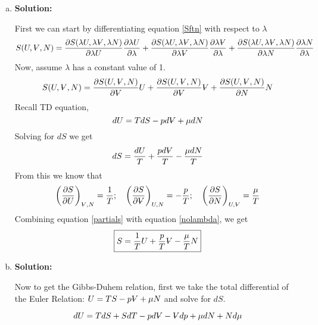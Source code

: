 \documentclass[10pt]{article}
\newenvironment{Solution}
    {\textbf{Solution:}
    
    \vspace{5mm}
    \begin{tcolorbox}
    }
    {
    \end{tcolorbox}
    \vspace{5mm}
    }
\newcommand{\vol}{{\ooalign{\hfil$V$\hfil\cr\kern0.08em--\hfil\cr}}}
\begin{document}
\begin{enumerate}[(a)]
\item
\begin{Solution}
 First we can start by differentiating equation \ref{Sftn} with respect to $\lambda$
\begin{equation}
    S(U, \vol, N) =\frac{\partial S(\lambda U, \lambda \vol, \lambda N)}{\partial \lambda U} \frac{\partial \lambda U}{\partial \lambda}
    +\frac{\partial S(\lambda U, \lambda \vol, \lambda N)}{\partial \lambda \vol} \frac{\partial \lambda \vol}{\partial \lambda}
    +\frac{\partial S(\lambda U, \lambda \vol, \lambda N)}{\partial \lambda N} \frac{\partial \lambda N}{\partial \lambda}
\end{equation}
Now, assume $\lambda$ has a constant value of 1.
\begin{equation}\label{nolambda}
    S(U, \vol, N)=\frac{\partial S(U, \vol, N)}{\partial \vol} U+\frac{\partial S(U, \vol, N)}{\partial \vol} \vol+\frac{\partial S(U, \vol, N)}{\partial N} N
\end{equation}
Recall TD equation,
\begin{equation}
    dU = T dS - p d\vol + \mu dN
\end{equation}
Solving for $dS$ we get
\begin{equation}
 dS = \frac{dU}{T} + \frac{p d\vol}{T} -\frac{\mu dN}{T} 
\end{equation}
From this we know that 
\begin{equation}\label{partials}
\left(\frac{\partial S}{\partial U}\right)_{\scriptsize{\vol}, N}=\frac{1}{T} ;
\quad \left(\frac{\partial S}{\partial \vol}\right)_{U, N}=-\frac{p}{T} ;
\quad \left(\frac{\partial S}{\partial N}\right)_{U, \scriptsize{\vol}}=\frac{\mu}{T}
\end{equation}
Combining equation \ref{partials} with equation \ref{nolambda},  we get
\begin{equation}\label{ans1}
\boxed{
S=\frac{1}{T} U+\frac{p}{T} \vol-\frac{\mu}{T} N
}
\end{equation}
\end{Solution}
\newpage

\item

\begin{Solution}
 Now to get the Gibbs-Duhem relation, first we take the total differential of the Euler Relation: $U = TS - p\vol +\mu N$ and solve for $dS$.

\begin{equation}
    dU = T dS + S dT -p d\vol - \vol dp +\mu dN +N d\mu
\end{equation}


\end{Solution}
\end{enumerate}
\end{document}
